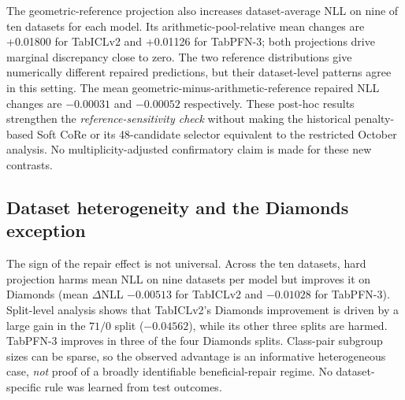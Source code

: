 \documentclass[a4paper,fleqn]{cas-sc}
\begin{document}
\begin{table}[t]
\centering
\caption{Exploratory reference-distribution ablation at training context 256. Differences are dataset-balanced test NLL changes; positive values indicate harm. The last column counts datasets with worse geometric-reference repair than arithmetic pooling. The geometric reference corresponds to the equal-weight historical projection, not to the complete Protocol A 48-candidate selector.}
\label{tab:projref}
\end{table}
The geometric-reference projection also increases dataset-average NLL on nine of ten datasets for each model. Its arithmetic-pool-relative mean changes are +0.01800 for TabICLv2 and +0.01126 for TabPFN-3; both projections drive marginal discrepancy close to zero. The two reference distributions give numerically different repaired predictions, but their dataset-level patterns agree in this setting. The mean geometric-minus-arithmetic-reference repaired NLL changes are $-0.00031$ and $-0.00052$ respectively. These post-hoc results strengthen the \emph{reference-sensitivity check} without making the historical penalty-based Soft CoRe or its 48-candidate selector equivalent to the restricted October analysis. No multiplicity-adjusted confirmatory claim is made for these new contrasts.

\subsection{Dataset heterogeneity and the Diamonds exception}
The sign of the repair effect is not universal. Across the ten datasets, hard projection harms mean NLL on nine datasets per model but improves it on Diamonds (mean $\Delta$NLL $-0.00513$ for TabICLv2 and $-0.01028$ for TabPFN-3). Split-level analysis shows that TabICLv2's Diamonds improvement is driven by a large gain in the $71/0$ split ($-0.04562$), while its other three splits are harmed. TabPFN-3 improves in three of the four Diamonds splits. Class-pair subgroup sizes can be sparse, so the observed advantage is an informative heterogeneous case, \emph{not} proof of a broadly identifiable beneficial-repair regime. No dataset-specific rule was learned from test outcomes.
\end{document}
